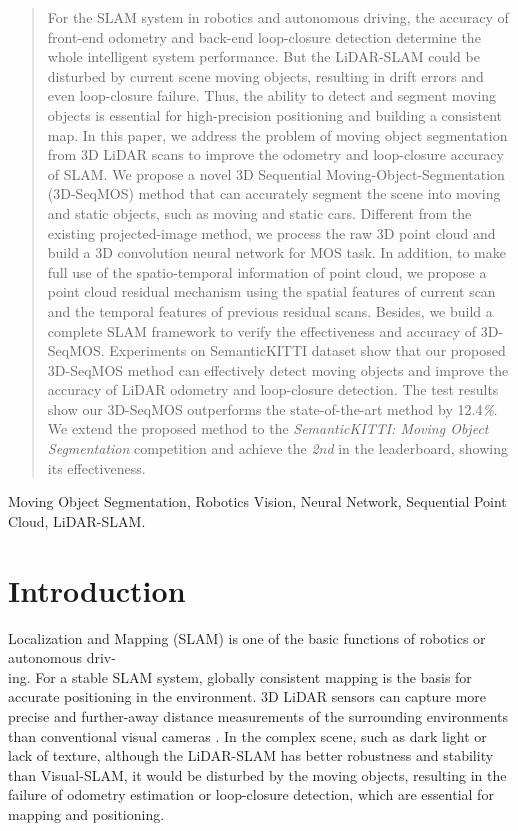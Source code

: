 \documentclass[lettersize,journal]{IEEEtran}
\begin{document}
\begin{abstract}
For the SLAM system in robotics and autonomous driving, the accuracy of front-end odometry and back-end loop-closure detection determine the whole intelligent system performance. But the LiDAR-SLAM could be disturbed by current scene moving objects, resulting in drift errors and even loop-closure failure. Thus, the ability to detect and segment moving objects is essential for high-precision positioning and building a consistent map. In this paper, we address the problem of moving object segmentation from 3D LiDAR scans to improve the odometry and loop-closure accuracy of SLAM. We propose a novel 3D Sequential Moving-Object-Segmentation (3D-SeqMOS) method that can accurately segment the scene into moving and static objects, such as moving and static cars. Different from the existing projected-image method, we process the raw 3D point cloud and build a 3D convolution neural network for MOS task. In addition, to make full use of the spatio-temporal information of point cloud, we propose a point cloud residual mechanism using the spatial features of current scan and the temporal features of previous residual scans. Besides, we build a complete SLAM framework to verify the effectiveness and accuracy of 3D-SeqMOS. Experiments on SemanticKITTI dataset show that our proposed 3D-SeqMOS method can effectively detect moving objects and improve the accuracy of LiDAR odometry and loop-closure detection. The test results show our 3D-SeqMOS outperforms the state-of-the-art method by 12.4\emph{\%}. We extend the proposed method to the \emph{SemanticKITTI: Moving Object Segmentation} competition and achieve the \emph{2nd} in the leaderboard, showing its effectiveness.


\end{abstract}
\begin{IEEEkeywords}
Moving Object Segmentation, Robotics Vision, Neural Network, Sequential Point Cloud, LiDAR-SLAM.
\end{IEEEkeywords}

\section{Introduction}
 Localization and Mapping (SLAM) is one of the basic functions of robotics or autonomous driv-\\ing. For a stable SLAM system, globally consistent mapping is the basis for accurate positioning in the environment. 3D LiDAR sensors can capture more precise and further-away distance measurements of the surrounding environments than conventional visual cameras \cite{li2020deep}. In the complex scene, such as dark light or lack of texture, although the LiDAR-SLAM has better robustness and stability than Visual-SLAM, it would be disturbed by the moving objects, resulting in the failure of odometry estimation or loop-closure detection, which are essential for mapping and positioning.
\end{document}
